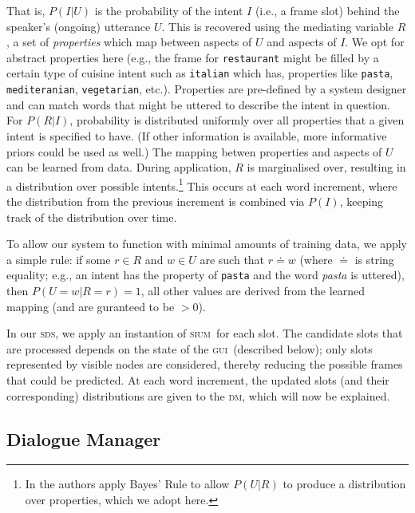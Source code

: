 \documentclass[11pt]{article}
\newcommand{\sds}[0]{\textsc{sds}}
\newcommand{\sium}[0]{\textsc{sium}}
\newcommand{\dm}[0]{\textsc{dm}}
\newcommand{\ui}[0]{\textsc{gui}}
\begin{document}
That is, $P(I|U)$ is the probability of the intent $I$ (i.e., a frame slot) behind the speaker's (ongoing) utterance $U$. This is recovered using the mediating variable $R$, a set of \emph{properties} which map between aspects of $U$ and aspects of $I$. We opt for abstract properties here (e.g., the frame for \texttt{restaurant} might be filled by a certain type of cuisine intent such as \texttt{italian} which has, properties like \texttt{pasta}, \texttt{mediteranian}, \texttt{vegetarian}, etc.). Properties are pre-defined by a system designer and can match words that might be uttered to describe the intent in question. For $P(R|I)$, probability is distributed uniformly over all properties that a given intent is specified to have. (If other information is available, more informative priors could be used as well.) The mapping betwen properties and aspects of $U$ can be learned from data. During application, $R$ is marginalised over, resulting in a distribution over possible intents.\footnote{In  the authors apply Bayes' Rule to allow $P(U|R)$ to produce a distribution over properties, which we adopt here.} This occurs at each word increment, where the distribution from the previous increment is combined via $P(I)$, keeping track of the distribution over time. 

To allow our system to function with minimal amounts of training data, we apply a simple rule: if some $r \in R$ and $w \in U$ are such that $r\doteq w$  (where $\doteq$ is string equality; e.g., an intent has the property of \texttt{pasta} and the word \emph{pasta} is uttered), then $P(U=w|R=r) = 1$, all other values are derived from the learned mapping (and are guranteed to be $>0$). 

In our \sds, we apply an instantion of \sium\ for each slot. The candidate slots that are processed depends on the state of the \ui\ (described below); only slots represented by visible nodes are considered, thereby reducing the possible frames that could be predicted. At each word increment, the updated slots (and their corresponding) distributions are given to the \dm, which will now be explained. 

\subsection{Dialogue Manager}
\end{document}
